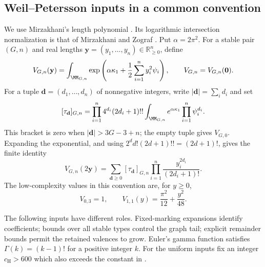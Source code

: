 \subsection{Weil–Petersson inputs in a common convention}
\label{subsec:s03:01}

We use Mirzakhani's length polynomial \cite[Theorem~4.4]{Mir07}.
Its logarithmic intersection normalization is that of Mirzakhani and
Zograf \cite[Section~2]{MZ15}. Put $\alpha=2\pi^2$.
For a stable pair $(G,n)$ and real lengths
$\mathbf y=(y_1,\ldots,y_n)\in\mathbb R_{\geq0}^n$, define
\begin{equation}
\label{eq:s03:wp-definition}
V_{G,n}(\mathbf y)
=\int_{\MM_{G,n}}\exp\left(\alpha\kappa_1+
  \frac12\sum_{i=1}^ny_i^2\psi_i\right),
\qquad V_{G,n}=V_{G,n}(\mathbf0).
\end{equation}
For a tuple $\mathbf d=(d_1,\ldots,d_n)$ of nonnegative integers, write
$|\mathbf d|=\sum_i d_i$ and set
\begin{equation}
\label{eq:s03:descendants}
[\tau_{\mathbf d}]_{G,n}
=\prod_{i=1}^n4^{d_i}(2d_i+1)!!
  \int_{\MM_{G,n}}e^{\alpha\kappa_1}\prod_{i=1}^n\psi_i^{d_i}.
\end{equation}
This bracket is zero when $|\mathbf d|>3G-3+n$; the empty tuple gives
$V_{G,0}$. Expanding the exponential, and using
$2^d d!(2d+1)!!=(2d+1)!$, gives the finite identity
\begin{equation}
\label{eq:s03:length-polynomial}
V_{G,n}(2\mathbf y)
=\sum_{\mathbf d\geq0}[\tau_{\mathbf d}]_{G,n}
  \prod_{i=1}^n\frac{y_i^{2d_i}}{(2d_i+1)!}.
\end{equation}
The low-complexity values in this convention are, for $y\geq0$,
\begin{equation}
\label{eq:s03:low-types}
V_{0,3}=1,\qquad
V_{1,1}(y)=\frac{\pi^2}{12}+\frac{y^2}{48}.
\end{equation}

The following inputs have different roles. Fixed-marking expansions
identify coefficients; bounds over all stable types control the graph
tail; explicit remainder bounds permit the retained valences to grow.
Euler's gamma function satisfies $\Gamma(k)=(k-1)!$ for a positive
integer $k$.
For the uniform inputs fix an integer $c_{\mathrm H}>600$ which also
exceeds the constant in \cite[Lemma~2.6]{HMT25}.

